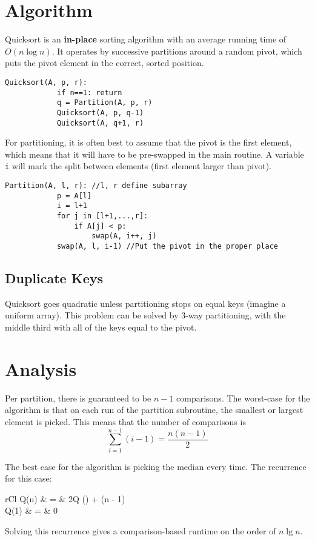 \documentclass[11pt]{article}
\begin{document}
\section{Algorithm}
	Quicksort is an \textbf{in-place} sorting algorithm with an average running time of $O(n\log n)$. It operates by successive partitions around a random pivot, which puts the pivot element in the correct, sorted position.
	
	\begin{lstlisting}[autogobble=true]
		Quicksort(A, p, r):
			if n==1: return
			q = Partition(A, p, r)
			Quicksort(A, p, q-1)
			Quicksort(A, q+1, r)
	\end{lstlisting}
	
	For partitioning, it is often best to assume that the pivot is the first element, which means that it will have to be pre-swapped in the main routine. A variable \verb|i| will mark the split between elements (first element larger than pivot).
	
	\begin{lstlisting}[autogobble=true]
		Partition(A, l, r):	//l, r define subarray
			p = A[l]
			i = l+1
			for j in [l+1,...,r]:
				if A[j] < p:
					swap(A, i++, j)
			swap(A, l, i-1)	//Put the pivot in the proper place
	\end{lstlisting}
	
	\subsection{Duplicate Keys}
		Quicksort goes quadratic unless partitioning stops on equal keys (imagine a uniform array). This problem can be solved by 3-way partitioning, with the middle third with all of the keys equal to the pivot.
	
\section{Analysis}
	Per partition, there is guaranteed to be $n-1$ comparisons. The worst-case for the algorithm is that on each run of the partition subroutine, the smallest or largest element is picked. This means that the number of comparisons is
	\begin{equation}
		\sum_{i=1}^{n-1} (i - 1) = \frac{n(n-1)}{2}
	\end{equation}
	
	The best case for the algorithm is picking the median every time. The recurrence for this case:
	\begin{IEEEeqnarray}{rCl}
		Q(n) & = & 2Q \left(\right) + (n - 1)\\
		Q(1) & = & 0
	\end{IEEEeqnarray}
	Solving this recurrence gives a comparison-based runtime on the order of $n\lg n$.
	
\end{document}
